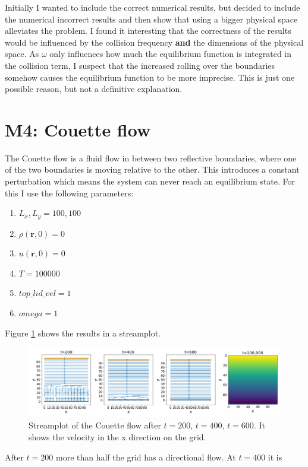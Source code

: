 \documentclass[a4paper,11pt, oneside]{book}
\begin{document}
Initially I wanted to include the correct numerical results, but decided to include the numerical incorrect results and then show that using a bigger physical space alleviates the problem.
I found it interesting that the correctness of the results would be influenced by the collision frequency \textbf{and} the dimensions of the physical space. 
As $\omega$ only influences how much the equilibrium function is integrated in the collision term, I suspect that the increased rolling over the boundaries somehow causes the equilibrium function to be more imprecise. 
This is just one possible reason, but not a definitive explanation.

\section{M4: Couette flow}
The Couette flow is a fluid flow in between two reflective boundaries, where one of the two boundaries is moving relative to the other.
This introduces a constant perturbation which means the system can never reach an equilibrium state.
For this I use the following parameters:
\begin{enumerate}
    \item $L_{x}, L_{y} = 100, 100$
    \item $\rho(\textbf{r}, 0) = 0$
    \item $u(\textbf{r}, 0) = 0$
    \item $T = 100000$
    \item $top\_lid\_vel = 1$
    \item $omega = 1$
\end{enumerate}
Figure \ref{fig:m4-1-streamplot} shows the results in a streamplot.
\begin{figure}[ht]
\centering
\includegraphics[width=\columnwidth]{milestones/final/img/m4-1-streamplot.png}
\caption[Couette flow ]{Streamplot of the Couette flow after $t=200$, $t=400$, $t=600$. It shows the velocity in the x direction on the grid.}
\label{fig:m4-1-streamplot}
\end{figure}
After $t=200$ more than half the grid has a directional flow. At $t=400$ it is 







% 
\end{document}
